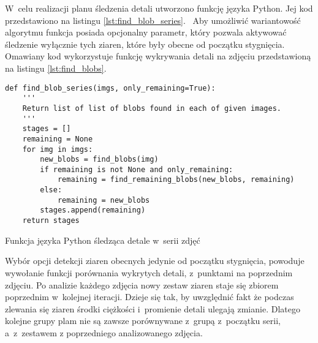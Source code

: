 W~celu realizacji planu śledzenia detali utworzono funkcję języka Python.
Jej kod przedstawiono na listingu \ref{lst:find_blob_series}.~%
Aby umożliwić wariantowość algorytmu funkcja posiada opcjonalny parametr, który
pozwala aktywować śledzenie wyłącznie tych ziaren, które były obecne od początku
stygnięcia.
Omawiany kod wykorzystuje funkcję wykrywania detali na zdjęciu przedstawioną na
listingu \ref{lst:find_blobs}.~%
\begin{listing}[htb]
\begin{verbatim}
def find_blob_series(imgs, only_remaining=True):
    '''
    Return list of list of blobs found in each of given images.
    '''
    stages = []
    remaining = None
    for img in imgs:
        new_blobs = find_blobs(img)
        if remaining is not None and only_remaining:
            remaining = find_remaining_blobs(new_blobs, remaining)
        else:
            remaining = new_blobs
        stages.append(remaining)
    return stages
\end{verbatim}
\caption{Funkcja języka Python śledząca detale w~serii zdjęć}
\label{lst:find_blob_series}
\end{listing}
Wybór opcji detekcji ziaren obecnych jedynie od początku stygnięcia, powoduje
wywołanie funkcji porównania wykrytych detali, z~punktami na poprzednim zdjęciu.
Po analizie każdego zdjęcia nowy zestaw ziaren staje się zbiorem poprzednim
w~kolejnej iteracji.
Dzieje się tak, by uwzględnić fakt że podczas zlewania się ziaren środki
ciężkości i~promienie detali ulegają zmianie.
Dlatego kolejne grupy plam nie są zawsze porównywane z~grupą z~początku serii,
a~z~zestawem z poprzedniego analizowanego zdjęcia.

